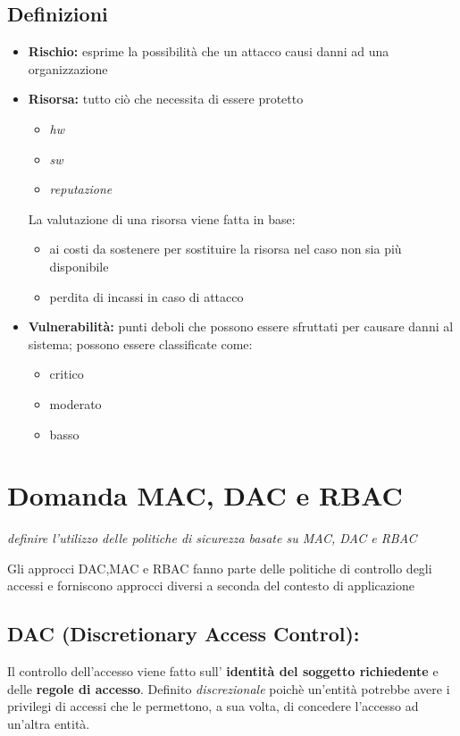 \documentclass{report}
\begin{document}
\subsection{Definizioni}
\begin{itemize}
    \item \textbf{Rischio:} esprime la possibilità che un attacco causi danni ad una 
    organizzazione
    \item \textbf{Risorsa:} tutto ciò che necessita di essere protetto
    \begin{itemize}
        \item \textit{hw}
        \item \textit{sw}
        \item \textit{reputazione}
    \end{itemize}
    
    \noindent La valutazione di una risorsa viene fatta in base:
    \begin{itemize}
        \item ai costi da sostenere per sostituire la risorsa nel caso non sia più disponibile 
        \item perdita di incassi in caso di attacco 
    \end{itemize}
    \item \textbf{Vulnerabilità:} punti deboli che possono essere sfruttati per causare danni al 
    sistema; possono essere classificate come:
    \begin{itemize}
        \item critico 
        \item moderato 
        \item basso
    \end{itemize}
\end{itemize}



\section{Domanda MAC, DAC e RBAC}
\begin{center}
    \textit{definire l'utilizzo delle politiche di sicurezza basate su MAC, DAC e RBAC}
\end{center}
\noindent Gli approcci DAC,MAC e RBAC fanno parte delle politiche di controllo degli accessi e forniscono approcci diversi
a seconda del contesto di applicazione
\subsection{DAC (Discretionary Access Control):}
\noindent Il controllo dell'accesso viene fatto sull' \textbf{identità del soggetto richiedente} e delle \textbf{regole di accesso}.
Definito \textit{discrezionale} poichè un'entità potrebbe avere i privilegi di accessi che le permettono, a sua volta, di concedere l'accesso ad un'altra entità.
\end{document}
